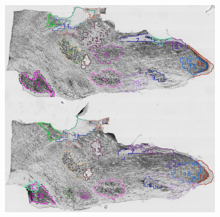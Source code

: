 \documentclass{llncs}
\begin{document}
\begin{figure}
	\includegraphics[width=\textwidth]{../figures/MatchedLMs_0006_0007.png}
	\caption{}
	\label{fig:LandmarkMatch}
\end{figure}
\end{document}
